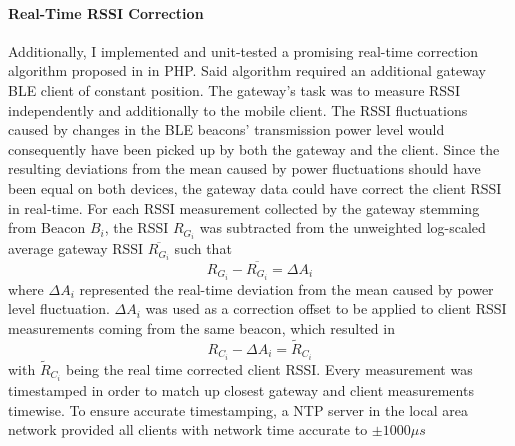 \documentclass[a4paper, oneside]{ipsreport}
\begin{document}
\paragraph{Real-Time RSSI Correction}
Additionally, I implemented and unit-tested a promising real-time correction algorithm proposed in \autocite{GatewayClient} in PHP. Said algorithm required an additional gateway BLE client of constant position. The gateway's task was to measure RSSI independently and additionally to the mobile client. The RSSI fluctuations caused by changes in the BLE beacons' transmission power level would consequently have been picked up by both the gateway and the client. Since the resulting deviations from the mean caused by power fluctuations should have been equal on both devices, the gateway data could have correct the client RSSI in real-time. For each RSSI measurement collected by the gateway stemming from Beacon $B_i$, the RSSI $R_{G_i}$ was subtracted from the unweighted log-scaled average gateway RSSI $\overline{R_{G_i}}$ such that
\begin{equation} \label{eq:gatewayClientBeacon}
	R_{G_i} - \overline{R_{G_i}} = \Delta A_i
\end{equation}
where $\Delta A_i$ represented the real-time deviation from the mean caused by power level fluctuation. $\Delta A_i$ was used as a correction offset to be applied to client RSSI measurements coming from the same beacon, which resulted in
\begin{equation} \label{eq:correctionOffset}
	R_{C_i} - \Delta A_i = \tilde{R}_{C_i}
\end{equation}
with $\tilde{R}_{C_i}$ being the real time corrected client RSSI. Every measurement was timestamped in order to match up closest gateway and client measurements timewise. To ensure accurate timestamping, a NTP server in the local area network provided all clients with network time accurate to $\pm 1000 \mu s$
\end{document}
